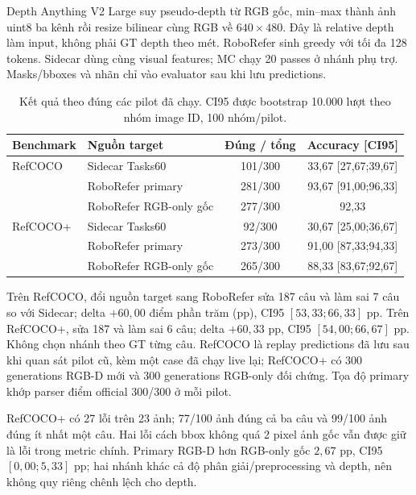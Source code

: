 \documentclass[11pt,a4paper]{article}
\begin{document}
Depth Anything V2 Large suy pseudo-depth từ RGB gốc, min--max thành ảnh uint8
ba kênh rồi resize bilinear cùng RGB về $640\times480$. Đây là relative depth
làm input, không phải GT depth theo mét. RoboRefer sinh greedy với tối đa
128 tokens. Sidecar dùng cùng visual features; MC chạy 20 passes ở nhánh phụ trợ.
Masks/bboxes và nhãn chỉ vào evaluator sau khi lưu predictions.

\begin{table}[H]\centering\small
\caption{Kết quả theo đúng các pilot đã chạy. CI95 được bootstrap 10.000 lượt
theo nhóm image ID, 100 nhóm/pilot.}
\label{tab:pilot-results}
\begin{tabularx}{\linewidth}{P{3.0cm} Y c c}
\toprule
Benchmark & Nguồn target & Đúng / tổng & Accuracy [CI95]\\
\midrule
RefCOCO & Sidecar Tasks60 & 101/300 & 33,67 [27,67;39,67]\\
 & RoboRefer primary & 281/300 & 93,67 [91,00;96,33]\\
 & RoboRefer RGB-only gốc & 277/300 & 92,33\\
\midrule
RefCOCO+ & Sidecar Tasks60 & 92/300 & 30,67 [25,00;36,67]\\
 & RoboRefer primary & 273/300 & 91,00 [87,33;94,33]\\
 & RoboRefer RGB-only gốc & 265/300 & 88,33 [83,67;92,67]\\
\bottomrule
\end{tabularx}
\end{table}

Trên RefCOCO, đổi nguồn target sang RoboRefer sửa 187 câu và làm sai 7 câu
so với Sidecar; delta $+60,00$ điểm phần trăm (pp), CI95 $[53,33;66,33]$ pp.
Trên RefCOCO+, sửa 187 và làm sai 6 câu; delta $+60,33$ pp,
CI95 $[54,00;66,67]$ pp. Không chọn nhánh theo GT từng câu.
RefCOCO là replay predictions đã lưu sau khi quan sát pilot cũ, kèm một case
đã chạy live lại; RefCOCO+ có 300 generations RGB-D mới và 300 generations
RGB-only đối chứng. Tọa độ primary khớp parser điểm official 300/300 ở mỗi pilot.

RefCOCO+ có 27 lỗi trên 23 ảnh; 77/100 ảnh đúng cả ba câu và 99/100 ảnh đúng
ít nhất một câu. Hai lỗi cách bbox không quá 2 pixel ảnh gốc vẫn được giữ là
lỗi trong metric chính. Primary RGB-D hơn RGB-only gốc $2,67$ pp, CI95
$[0,00;5,33]$ pp; hai nhánh khác cả độ phân giải/preprocessing và depth,
nên không quy riêng chênh lệch cho depth.
\end{document}
